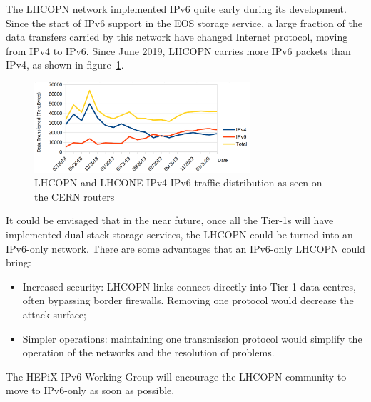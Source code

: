 
The LHCOPN network implemented IPv6 quite early during its development. 
Since the start of IPv6 support in the EOS storage service, a large fraction of the data transfers carried by this network have changed Internet protocol, moving from IPv4 to IPv6. Since June 2019, LHCOPN carries more IPv6 packets than IPv4, as shown in figure~\ref{fig:lhcopne-traffic}.

\begin{figure}[h]
\centering
\includegraphics[width=8cm]{lhcopne-traffic.png}
\caption{LHCOPN and LHCONE IPv4-IPv6 traffic distribution as seen on the CERN routers\cite{RefLHCOPNEv4v6}  }
\label{fig:lhcopne-traffic}
\end{figure}


It could be envisaged that in the near future, once all the Tier-1s will have implemented dual-stack storage services, the LHCOPN could be turned into an IPv6-only network. There are some advantages that an IPv6-only LHCOPN could bring:
\begin{itemize}
  \item Increased security: LHCOPN links connect directly into Tier-1 data-centres, often bypassing border firewalls. Removing one protocol would decrease the attack surface;
  \item Simpler operations: maintaining one transmission protocol would simplify the operation of the networks and the resolution of problems.
\end{itemize}

The HEPiX IPv6 Working Group will encourage the LHCOPN community to move to IPv6-only as soon as possible.




